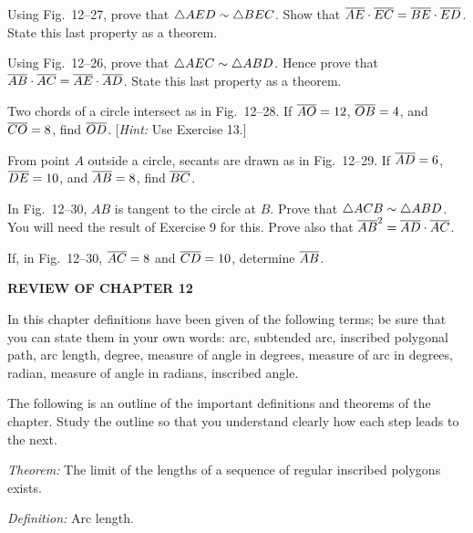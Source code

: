 \documentclass[11pt]{book}
\begin{document}
\begin{exercisecols}
\begin{exlist}
\item[13.] Using Fig.~12--27, prove that $\triangle AED \sim \triangle BEC$. Show that
      $\overline{AE} \cdot \overline{EC} = \overline{BE} \cdot \overline{ED}$. State this last property
      as a theorem.
\item[\stex 14.] Using Fig.~12--26, prove that $\triangle AEC \sim \triangle ABD$.
      Hence prove that $\overline{AB} \cdot \overline{AC} = \overline{AE} \cdot \overline{AD}$. State
      this last property as a theorem.
\item[15.] Two chords of a circle intersect as in Fig.~12--28. If
      $\overline{AO} = 12$, $\overline{OB} = 4$, and $\overline{CO} = 8$, find $\overline{OD}$.
      [\emph{Hint:} Use Exercise 13.]
\exfig{\FIGXIITWENTYEIGHT}
\item[\stex 16.] From point $A$ outside a circle, secants are drawn as in
      Fig.~12--29. If $\overline{AD} = 6$, $\overline{DE} = 10$, and $\overline{AB} = 8$, find
      $\overline{BC}$.
\exfig{\FIGXIITWENTYNINE}
\item[\stex 17.] In Fig.~12--30, $AB$ is tangent to the circle at $B$. Prove
      that $\triangle ACB \sim \triangle ABD$. You will need the result of Exercise 9
      for this. Prove also that $\overline{AB}^2 = \overline{AD} \cdot \overline{AC}$.
\exfig{\FIGXIITHIRTY}
\item[18.] If, in Fig.~12--30, $\overline{AC} = 8$ and $\overline{CD} = 10$, determine
      $\overline{AB}$.
\end{exlist}

\par\bigskip
\begin{center}\bfseries\large REVIEW OF CHAPTER 12\end{center}
\nopagebreak

In this chapter definitions have been given of the following terms; be sure that
you can state them in your own words: arc, subtended arc, inscribed polygonal
path, arc length, degree, measure of angle in degrees, measure of arc in
degrees, radian, measure of angle in radians, inscribed angle.

The following is an outline of the important definitions and theorems of the
chapter. Study the outline so that you understand clearly how each step leads to
the next.

\par\smallskip\noindent\emph{Theorem:} The limit of the lengths of a sequence of
regular inscribed polygons exists.

\noindent\emph{Definition:} Arc length.


\end{exercisecols}
\end{document}
